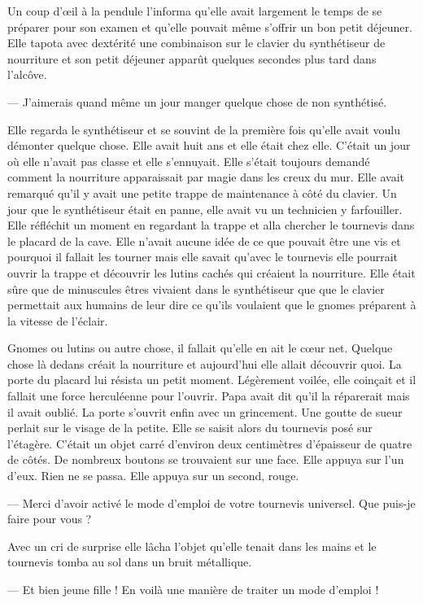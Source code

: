 \documentclass[ebook,12pt,oneside,onecolumn,openright,draft]{memoir}
\begin{document}
Un coup d'œil à la pendule l'informa qu'elle avait largement le temps de se
préparer pour son examen et qu'elle pouvait même s'offrir un bon petit déjeuner.
Elle tapota avec dextérité une combinaison sur le clavier du synthétiseur de
nourriture et son petit déjeuner apparût quelques secondes plus tard dans
l’alcôve.

  — J'aimerais quand même un jour manger quelque chose de non synthétisé.

Elle regarda le synthétiseur et se souvint de la première fois qu'elle avait
voulu démonter quelque chose. Elle avait huit ans et elle était chez elle.
C'était un jour où elle n'avait pas classe et elle s'ennuyait. Elle s'était
toujours demandé comment la nourriture apparaissait par magie dans les creux du
mur. Elle avait remarqué qu'il y avait une petite trappe de maintenance à côté
du clavier. Un jour que le synthétiseur était en panne, elle avait vu un
technicien y farfouiller. Elle réfléchit un moment en regardant la trappe et
alla chercher le tournevis dans le placard de la cave. Elle n'avait aucune idée
de ce que pouvait être une vis et pourquoi il fallait les tourner mais elle
savait qu'avec le tournevis elle pourrait ouvrir la trappe et découvrir les
lutins cachés qui créaient la nourriture. Elle était sûre que de minuscules
êtres vivaient dans le synthétiseur que que le clavier permettait aux humains de
leur dire ce qu'ils voulaient que le gnomes préparent à la vitesse de l'éclair.

Gnomes ou lutins ou autre chose, il fallait qu'elle en ait le cœur net. Quelque
chose là dedans créait la nourriture et aujourd'hui elle allait découvrir quoi.
La porte du placard lui résista un petit moment. Légèrement voilée, elle
coinçait et il fallait une force herculéenne pour l'ouvrir. Papa avait dit qu'il
la réparerait mais il avait oublié. La porte s'ouvrit enfin avec un grincement.
Une goutte de sueur perlait sur le visage de la petite. Elle se saisit alors du
tournevis posé sur l'étagère. C'était un objet carré d'environ deux centimètres
d'épaisseur de quatre de côtés. De nombreux boutons se trouvaient sur une face.
Elle appuya sur l'un d'eux. Rien ne se passa. Elle appuya sur un second, rouge.

— Merci d'avoir activé le mode d'emploi de votre tournevis universel. Que
puis-je faire pour vous ?

Avec un cri de surprise elle lâcha l'objet qu'elle tenait dans les mains et le
tournevis tomba au sol dans un bruit métallique.

  — Et bien jeune fille ! En voilà une manière de traiter un mode d'emploi !
\end{document}
